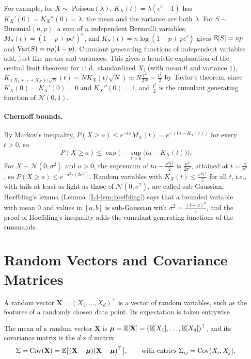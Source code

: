 For example, for $X \sim$ Poisson$(\lambda)$, $K_X(t) = \lambda(e^t - 1)$ has $K_X'(0) = K_X''(0) = \lambda$: the mean and the variance are both $\lambda$. For $S \sim$ Binomial$(n, p)$, a sum of $n$ independent Bernoulli variables, $M_S(t) = (1 - p + pe^t)^n$, and $K_S(t) = n\log(1 - p + pe^t)$ gives $\mathbb{E}[S] = np$ and $\operatorname{Var}(S) = np(1 - p)$. Cumulant generating functions of independent variables add, just like means and variances. This gives a heuristic explanation of the central limit theorem: for i.i.d.\ standardized $X_i$ (with mean $0$ and variance $1$), $K_{(X_1 + \cdots + X_N)/\sqrt{N}}(t) = NK_X(t/\sqrt{N}) \approx N\frac{t^2}{2N} = \frac{t^2}{2}$ by Taylor's theorem, since $K_X(0) = K_X'(0) = 0$ and $K_X''(0) = 1$, and $\frac{t^2}{2}$ is the cumulant generating function of $\mathcal{N}(0, 1)$.

\paragraph{Chernoff bounds.} By Markov's inequality, $P(X \geq a) \leq e^{-ta}M_X(t) = e^{-(ta - K_X(t))}$ for every $t > 0$, so
\[P(X \geq a) \leq \exp\Big(-\sup_{t > 0}\big(ta - K_X(t)\big)\Big).\]
For $X \sim \mathcal{N}(0, \sigma^2)$ and $a > 0$, the supremum of $ta - \frac{\sigma^2t^2}{2}$ is $\frac{a^2}{2\sigma^2}$, attained at $t = \frac{a}{\sigma^2}$, so $P(X \geq a) \leq e^{-a^2/(2\sigma^2)}$. Random variables with $K_X(t) \leq \frac{\sigma^2t^2}{2}$ for all $t$, i.e., with tails at least as light as those of $\mathcal{N}(0, \sigma^2)$, are called sub-Gaussian. Hoeffding's lemma (Lemma~\ref{L4-lem:hoeffding}) says that a bounded variable with mean $0$ and values in $[a, b]$ is sub-Gaussian with $\sigma^2 = \frac{(b - a)^2}{4}$, and the proof of Hoeffding's inequality adds the cumulant generating functions of the summands.

\section{Random Vectors and Covariance Matrices}\label{L4-sec:random-vectors}

A random vector $\mathbf{X} = (X_1, \ldots, X_d)^\top$ is a vector of random variables, such as the features of a randomly chosen data point. Its expectation is taken entrywise.

\begin{definition}\label{L4-def:covariance-matrix}
    The mean of a random vector $\mathbf{X}$ is $\boldsymbol{\mu} = \mathbb{E}[\mathbf{X}] = (\mathbb{E}[X_1], \ldots, \mathbb{E}[X_d])^\top$, and its covariance matrix is the $d \times d$ matrix
    \[\Sigma = \operatorname{Cov}(\mathbf{X}) = \mathbb{E}\big[(\mathbf{X} - \boldsymbol{\mu})(\mathbf{X} - \boldsymbol{\mu})^\top\big], \qquad \text{with entries } \Sigma_{ij} = \operatorname{Cov}(X_i, X_j).\]
\end{definition}

